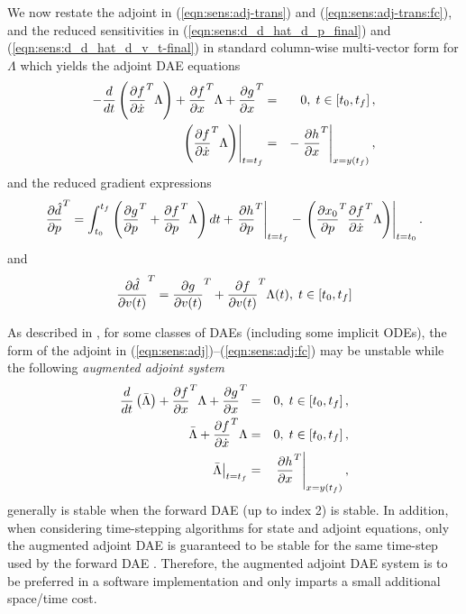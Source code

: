 \documentclass[pdf,ps2pdf,11pt]{SANDreport}
\begin{document}
We now restate the adjoint in (\ref{eqn:sens:adj-trans}) and
(\ref{eqn:sens:adj-trans:fc}), and the reduced sensitivities in
(\ref{eqn:sens:d_d_hat_d_p_final}) and (\ref{eqn:sens:d_d_hat_d_v_t-final}) in
standard column-wise multi-vector form for $\Lambda$ which yields the adjoint
DAE equations
%
\begin{eqnarray}
- \frac{d}{dt}\left( \displaystyle{\frac{\partial f}{\partial \dot{x}}}^T \Lambda \right)
+  \displaystyle{\frac{\partial f}{\partial x}}^T \Lambda + \displaystyle{\frac{\partial g}{\partial x}}^T
& = & 0, \; t \in \left[ t_0, t_f \right],
\label{eqn:sens:adj} \\
\left.\left( \displaystyle{\frac{\partial f}{\partial \dot{x}}}^T \Lambda \right)\right|_{t=t_f}
& = & - \left. \displaystyle{\frac{\partial h}{\partial x}}^T \right|_{x=y(t_f)},
\label{eqn:sens:adj:fc}
\end{eqnarray}
%
and the reduced gradient expressions
%
\begin{equation}
\displaystyle{\frac{\partial \hat{d}}{\partial p}}^T =
\int_{t_0}^{t_f} \left(
    \displaystyle{\frac{\partial g}{\partial p}}^T
    + \displaystyle{\frac{\partial f}{\partial p}}^T \Lambda
  \right) dt
  + \left. \displaystyle{\frac{\partial h}{\partial p}}^T \right|_{t=t_f}
  - \left. \left( \displaystyle{\frac{\partial x_0}{\partial p}}^T \displaystyle{\frac{\partial f}{\partial \dot{x}}}^T \Lambda \right) \right|_{t=t_0}.
\label{eqn:sens:d_d_hat_d_p_final-2}
\end{equation}
%
and
%
\begin{equation}
\displaystyle{\frac{\partial \hat{d}}{\partial v(t)}}^T =  \displaystyle{\frac{\partial g}{\partial v(t)}}^T + \displaystyle{\frac{\partial f}{\partial v(t)}}^T \Lambda(t), \; t\in[t_0,t_f]
\label{eqn:sens:d_d_hat_d_v_t-final-2}
\end{equation}
%

As described in {}\cite{adjoint-sens-2003}, for some classes of DAEs
(including some implicit ODEs), the form of the adjoint in
(\ref{eqn:sens:adj})--(\ref{eqn:sens:adj:fc}) may be unstable while the
following {}\textit{augmented adjoint system}
%
\begin{eqnarray}
\frac{d}{dt}\left( \bar{\Lambda} \right)
+  \displaystyle{\frac{\partial f}{\partial x}}^T \Lambda + \displaystyle{\frac{\partial g}{\partial x}}^T
& = & 0, \; t \in \left[ t_0, t_f \right],
\label{eqn:sens:aug-adj-de} \\
\bar{\Lambda} + \displaystyle{\frac{\partial f}{\partial \dot{x}}}^T \Lambda
& = & 0, \; t \in \left[ t_0, t_f \right],
\label{eqn:sens:aug-adj-ae} \\
\left. \bar{\Lambda} \right|_{t=t_f}
& = & \left. \displaystyle{\frac{\partial h}{\partial x}}^T \right|_{x=y(t_f)},
\label{eqn:sens:aug-adj:fc}
\end{eqnarray}
%
generally is stable when the forward DAE (up to index 2) is stable.  In
addition, when considering time-stepping algorithms for state and adjoint
equations, only the augmented adjoint DAE is guaranteed to be stable for the
same time-step used by the forward DAE {}\cite{adjoint-sens-2003}.  Therefore,
the augmented adjoint DAE system is to be preferred in a software
implementation and only imparts a small additional space/time cost.
\end{document}
